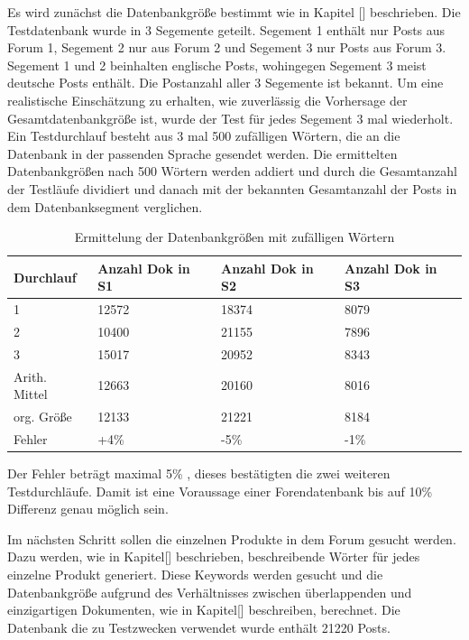 Es wird zunächst die Datenbankgröße bestimmt wie in Kapitel [] beschrieben. Die Testdatenbank wurde in 3 Segemente geteilt. Segement 1 enthält nur Posts aus Forum 1, Segement 2 nur aus Forum 2 und Segement 3 nur Posts aus Forum 3. 
Segement 1 und 2 beinhalten englische Posts, wohingegen Segement 3 meist deutsche Posts enthält. Die Postanzahl aller 3 Segemente ist bekannt. Um eine realistische Einschätzung zu erhalten, wie zuverlässig die Vorhersage der Gesamtdatenbankgröße ist, wurde der Test für jedes Segement 3 mal wiederholt. Ein Testdurchlauf besteht aus 3 mal 500 zufälligen Wörtern, die an die Datenbank in der passenden Sprache gesendet werden. Die ermittelten Datenbankgrößen nach 500 Wörtern werden addiert und durch die Gesamtanzahl der Testläufe dividiert und danach mit der bekannten Gesamtanzahl der Posts in dem Datenbanksegment verglichen.

\begin{table}[h!]
\begin{tabular}{ | p{3cm} | p{3cm} | p{3cm}| p{3cm} |} \hline
Durchlauf & Anzahl Dok in S1 & Anzahl Dok in S2 & Anzahl Dok in S3 \\ \hline
1 & 12572 & 18374 & 8079 \\ \hline
2 & 10400 & 21155 & 7896 \\ \hline
3 & 15017 & 20952 & 8343 \\ \hline
Arith. Mittel & 12663 & 20160 & 8016 \\ \hline
org. Größe & 12133 & 21221 & 8184 \\ \hline
Fehler & +4\% & -5\% & -1\% \\ \hline
\end{tabular}
\caption{Ermittelung der Datenbankgrößen mit zufälligen Wörtern}
\end{table}

\newpage

Der Fehler beträgt maximal 5\% , dieses bestätigten die zwei weiteren Testdurchläufe. Damit ist eine Voraussage einer Forendatenbank bis auf 10\% Differenz genau möglich sein.

Im nächsten Schritt sollen die einzelnen Produkte in dem Forum gesucht werden. Dazu werden, wie in Kapitel[] beschrieben, beschreibende Wörter für jedes einzelne Produkt generiert. Diese Keywords werden gesucht und die Datenbankgröße aufgrund des Verhältnisses zwischen überlappenden und einzigartigen Dokumenten, wie in Kapitel[] beschreiben, berechnet. Die Datenbank die zu Testzwecken verwendet wurde enthält 21220 Posts.

